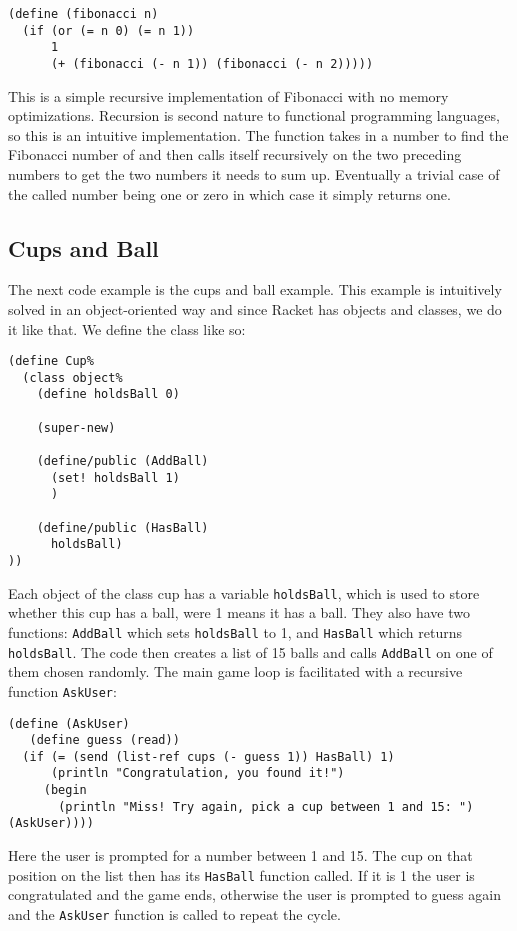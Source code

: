 \begin{lstlisting}
(define (fibonacci n)
  (if (or (= n 0) (= n 1))
      1
      (+ (fibonacci (- n 1)) (fibonacci (- n 2)))))
\end{lstlisting}

This is a simple recursive implementation of Fibonacci with no memory optimizations.
Recursion is second nature to functional programming languages, so this is an intuitive implementation.
The function takes in a number to find the Fibonacci number of and then calls itself recursively on the two preceding numbers to get the two numbers it needs to sum up.
Eventually a trivial case of the called number being one or zero in which case it simply returns one.

\subsection{Cups and Ball}
The next code example is the cups and ball example.
This example is intuitively solved in an object-oriented way and since Racket has objects and classes, we do it like that.
We define the class like so:

\begin{lstlisting}
(define Cup%
  (class object%
    (define holdsBall 0)

    (super-new)
    
    (define/public (AddBall)
      (set! holdsBall 1)
      )
    
    (define/public (HasBall)
      holdsBall)
))
\end{lstlisting}

Each object of the class cup has a variable \lstinline!holdsBall!, which is used to store whether this cup has a ball, were 1 means it has a ball.
They also have two functions: \lstinline!AddBall! which sets \lstinline!holdsBall! to 1, and \lstinline!HasBall! which returns \lstinline!holdsBall!.
The code then creates a list of 15 balls and calls \lstinline!AddBall! on one of them chosen randomly.
The main game loop is facilitated with a recursive function \lstinline!AskUser!:

\begin{lstlisting}
(define (AskUser)
   (define guess (read))
  (if (= (send (list-ref cups (- guess 1)) HasBall) 1)
      (println "Congratulation, you found it!")
     (begin
       (println "Miss! Try again, pick a cup between 1 and 15: ") (AskUser))))
\end{lstlisting}

Here the user is prompted for a number between 1 and 15.
The cup on that position on the list then has its \lstinline!HasBall! function called.
If it is 1 the user is congratulated and the game ends, otherwise the user is prompted to guess again and the \lstinline!AskUser! function is called to repeat the cycle.

